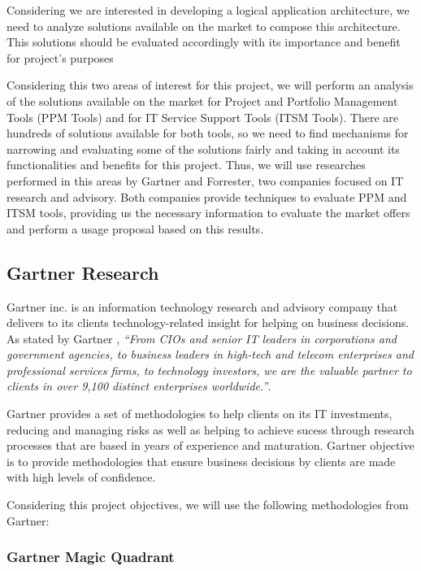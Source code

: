 Considering we are interested in developing a logical application architecture, we need to analyze solutions available on the market to compose this architecture. This solutions should be evaluated accordingly with its importance and benefit for project's purposes\par
Considering this two areas of interest for this project, we will perform an analysis of the solutions available on the market for Project and Portfolio Management Tools (PPM Tools) and for IT Service Support Tools (ITSM Tools). There are hundreds of solutions available for both tools, so we need to find mechanisms for narrowing and evaluating some of the solutions fairly and taking in account its functionalities and benefits for this project. Thus, we will use researches performed in this areas by Gartner and Forrester, two companies focused on IT research and advisory. Both companies provide techniques to evaluate PPM and ITSM tools, providing us the necessary information to evaluate the market offers and perform a usage proposal based on this results.\par

\subsection{Gartner Research}

Gartner inc. is an information technology research and advisory company that delivers to its clients technology-related insight for helping on business decisions. As stated by Gartner \cite{GartnerAbout}, \textit{``From CIOs and senior IT leaders in corporations and government agencies, to business leaders in high-tech and telecom enterprises and professional services firms, to technology investors, we are the valuable partner to clients in over 9,100 distinct enterprises worldwide.''}.\par
Gartner provides a set of methodologies to help clients on its IT investments, reducing and managing risks as well as helping to achieve sucess through research processes that are based in years of experience and maturation. Gartner objective is to provide methodologies that ensure business decisions by clients are made with high levels of confidence.\par
Considering this project objectives, we will use the following methodologies from Gartner:

\subsubsection{Gartner Magic Quadrant}

